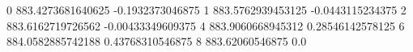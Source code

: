 0 883.4273681640625 -0.1932373046875
1 883.5762939453125 -0.0443115234375
2 883.6162719726562 -0.00433349609375
4 883.9060668945312 0.28546142578125
6 884.0582885742188 0.43768310546875
8 883.62060546875 0.0

